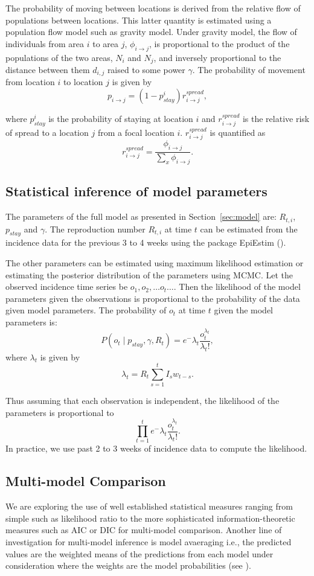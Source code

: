 \documentclass[11pt,]{article}
\begin{document}
The probability of moving between locations is derived from the relative flow of populations between
locations. This latter quantity is estimated using a population flow
model such as gravity model. Under gravity model, the flow of individuals from area \(i\) to area \(j\),
\(\phi_{i \rightarrow j}\), is proportional to the product of the
populations of the two areas, \(N_i\) and \(N_j\), and inversely proportional to the distance between them \(d_{i, j}\) raised to some
power $\gamma$. The probability of movement from location \(i\) to
location \(j\) is given by
\[  p_{i \rightarrow j} = (1 - p_{stay}^i) r_{i \rightarrow j}^{spread},\]

where \(p_{stay}^i\) is the probability of staying at location \(i\) and
\(r_{i \rightarrow j}^{spread}\) is the relative risk of spread to a
location \(j\) from a focal location \(i\).
\(r_{i \rightarrow j}^{spread}\) is quantified as \[
  r_{i \rightarrow j}^{spread} = \frac{\phi_{i \rightarrow
  j}}{\sum_{x}{\phi_{i \rightarrow
  j}}}.
\]

\subsection{Statistical inference of model parameters}
The parameters of the full model as presented in Section~\ref{sec:model} are: $R_{t, i}$, $p_{stay}$ and $\gamma$. The
reproduction number $R_{t, i}$ at time $t$ can be estimated from the
incidence data for the previous 3 to 4 weeks using the package EpiEstim
(\cite{cori2013new}). 

The other parameters can be estimated using maximum likelihood
estimation or estimating the posterior distribution of the parameters using
MCMC. Let the observed incidence time series be $o_1, o_2, \dots
o_t \dots $. Then the likelihood of the model parameters given the
observations is proportional to the probability of the data given
model parameters.  The probability of $o_t$ at time $t$ given
the model parameters is:
\[ P(o_t \mid p_{stay}, \gamma, R_t) = e^-{\lambda_t}
  \frac{o_t^{\lambda_t}}{\lambda_t !}, \]
where $\lambda_t$ is given by
\[\lambda_t = R_t \sum_{s = 1}^t{I_{s}w_{t - s}}.\]

Thus assuming that each observation is independent, the likelihood of the parameters is proportional to
\[
\prod_{t = 1}^{t}{e^-{\lambda_t} \frac{o_t^{\lambda_t}}{\lambda_t !}}.
\]
In practice, we use past 2 to 3 weeks of incidence data to compute the
likelihood.

\subsection{Multi-model Comparison}
We are exploring the use of well established statistical measures ranging from simple such as
likelihood ratio to the more sophisticated information-theoretic
measures such as AIC or DIC for multi-model comparison. Another line
of investigation for multi-model inference is model avaeraging i.e.,
the predicted values are the weighted means of the predictions from
each model under consideration where the weights are the model
probabilities (see \cite{burnham2011aic}). 
\end{document}
